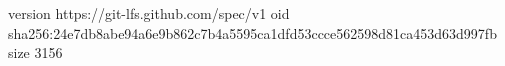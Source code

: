 version https://git-lfs.github.com/spec/v1
oid sha256:24e7db8abe94a6e9b862c7b4a5595ca1dfd53ccce562598d81ca453d63d997fb
size 3156
